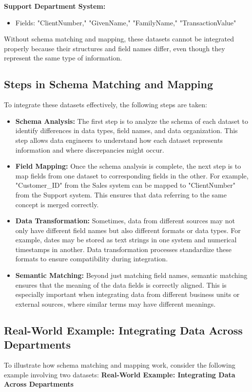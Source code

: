 \documentclass[12pt]{article}
\begin{document}
\textbf{Support Department System:}
\begin{itemize}
    \item Fields: "ClientNumber," "GivenName," "FamilyName," "TransactionValue"
\end{itemize}

Without schema matching and mapping, these datasets cannot be integrated properly because their structures and field names differ, even though they represent the same type of information.

\subsection{Steps in Schema Matching and Mapping}
To integrate these datasets effectively, the following steps are taken:

\begin{itemize}
    \item \textbf{Schema Analysis:} The first step is to analyze the schema of each dataset to identify differences in data types, field names, and data organization. This step allows data engineers to understand how each dataset represents information and where discrepancies might occur.

    \item \textbf{Field Mapping:} Once the schema analysis is complete, the next step is to map fields from one dataset to corresponding fields in the other. For example, "Customer\_ID" from the Sales system can be mapped to "ClientNumber" from the Support system. This ensures that data referring to the same concept is merged correctly.

    \item \textbf{Data Transformation:} Sometimes, data from different sources may not only have different field names but also different formats or data types. For example, dates may be stored as text strings in one system and numerical timestamps in another. Data transformation processes standardize these formats to ensure compatibility during integration.

    \item \textbf{Semantic Matching:} Beyond just matching field names, semantic matching ensures that the meaning of the data fields is correctly aligned. This is especially important when integrating data from different business units or external sources, where similar terms may have different meanings.
\end{itemize}

\subsection{Real-World Example: Integrating Data Across Departments}
To illustrate how schema matching and mapping work, consider the following example involving two datasets:
\textbf{Real-World Example: Integrating Data Across Departments}
\end{document}
